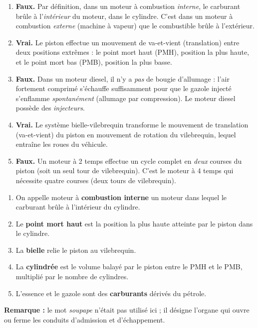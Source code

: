 \documentclass[11pt]{article}
\newcommand{\cle}[1]{{\popxbold\color{popdark}#1}}
\begin{document}
\begin{corrige}
\begin{enumerate}
\item \textbf{Faux.} Par définition, dans un moteur à combustion \emph{interne}, le carburant brûle à l'\emph{intérieur} du moteur, dans le cylindre. C'est dans un moteur à combustion \emph{externe} (machine à vapeur) que le combustible brûle à l'extérieur.
\item \textbf{Vrai.} Le piston effectue un mouvement de va-et-vient (translation) entre deux positions extrêmes : le \cle{point mort haut} (PMH), position la plus haute, et le \cle{point mort bas} (PMB), position la plus basse.
\item \textbf{Faux.} Dans un moteur diesel, il n'y a \emph{pas} de bougie d'allumage : l'air fortement comprimé s'échauffe suffisamment pour que le gazole injecté s'enflamme \emph{spontanément} (allumage par compression). Le moteur diesel possède des \emph{injecteurs}.
\item \textbf{Vrai.} Le système \cle{bielle}-\cle{vilebrequin} transforme le mouvement de translation (va-et-vient) du piston en mouvement de rotation du vilebrequin, lequel entraîne les roues du véhicule.
\item \textbf{Faux.} Un moteur à \cle{2 temps} effectue un cycle complet en \emph{deux} courses du piston (soit un seul tour de vilebrequin). C'est le moteur à 4 temps qui nécessite quatre courses (deux tours de vilebrequin).
\end{enumerate}
\end{corrige}

\begin{corrige}
\begin{enumerate}
\item On appelle moteur à \textbf{combustion interne} un moteur dans lequel le carburant brûle à l'intérieur du cylindre.
\item Le \textbf{point mort haut} est la position la plus haute atteinte par le piston dans le cylindre.
\item La \textbf{bielle} relie le piston au vilebrequin.
\item La \textbf{cylindrée} est le volume balayé par le piston entre le PMH et le PMB, multiplié par le nombre de cylindres.
\item L'essence et le gazole sont des \textbf{carburants} dérivés du pétrole.
\end{enumerate}
\textbf{Remarque :} le mot \emph{soupape} n'était pas utilisé ici ; il désigne l'organe qui ouvre ou ferme les conduits d'admission et d'échappement.
\end{corrige}
\end{document}
